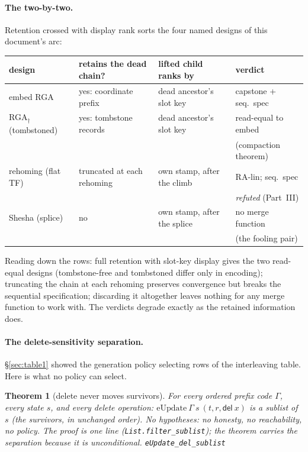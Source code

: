 \documentclass[11pt]{article}
\newtheorem{theorem}{Theorem}[section]
\newcommand{\lean}[1]{\texttt{#1}}
\newcommand{\code}[1]{\texttt{#1}}
\newcommand{\del}{\mathsf{del}}
\begin{document}
\paragraph{The two-by-two.} Retention crossed with display rank sorts
the four named designs of this document's arc:

\begin{center}\small
\setlength{\tabcolsep}{4pt}%
\begin{tabular}{@{}llll@{}}
\toprule
design & retains the dead chain? & lifted child ranks by &
  verdict \\
\midrule
embed RGA & yes: coordinate prefix & dead ancestor's slot key &
  capstone + seq.\ spec \\
RGA$_\dagger$ (tombstoned) & yes: tombstone records &
  dead ancestor's slot key & read-equal to embed \\
 & & & (compaction theorem) \\
rehoming (flat TF) & truncated at each rehoming &
  own stamp, after the climb & RA-lin; seq.\ spec \\
 & & & \emph{refuted} (Part~III) \\
Shesha (splice) & no & own stamp, after the splice &
  no merge function \\
 & & & (the fooling pair) \\
\bottomrule
\end{tabular}
\end{center}

\noindent Reading down the rows: full retention with slot-key display
gives the two read-equal designs (tombstone-free and tombstoned differ
only in encoding); truncating the chain at each rehoming preserves
convergence but breaks the sequential specification; discarding it
altogether leaves nothing for any merge function to work with. The
verdicts degrade exactly as the retained information does.

\paragraph{The delete-sensitivity separation.} \S\ref{sec:table1}
showed the generation policy selecting rows of the interleaving table.
Here is what no policy can select.

\begin{theorem}[delete never moves survivors]
\label{thm:delfree}
For every ordered prefix code $\Gamma$, every state $s$, and every
delete operation: $\mathrm{eUpdate}\ \Gamma\ s\ (t, r, \del\ x)$ is a
\emph{sublist} of $s$ (the survivors, in unchanged order). No
hypotheses: no honesty, no reachability, no policy. The proof is one
line (\code{List.filter\_sublist}); the theorem carries the separation
because it is unconditional.
\hfill\lean{eUpdate\_del\_sublist}
\end{theorem}
\end{document}
